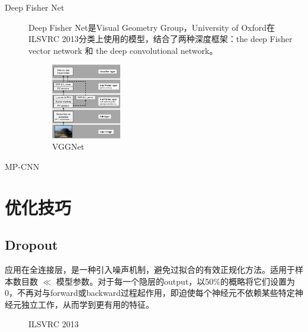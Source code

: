 \documentclass[12pt]{article}
\begin{document}
\begin{description}
\item[Deep Fisher Net] Deep Fisher Net\cite{simonyan2013deep}是Visual Geometry Group，University of Oxford在ILSVRC 2013分类上使用的模型，结合了两种深度框架：the deep Fisher vector network 和 the deep convolutional network。
\begin{figure}[!ht]
\centering
\includegraphics[width=0.3\textwidth]{vggnet1}
\caption{VGGNet}
\end{figure}

\item[MP-CNN]  
\end{description}

\section{优化技巧}
\subsection{Dropout}
应用在全连接层，是一种引入噪声机制，避免过拟合的有效正规化方法。适用于样本数目数 $\ll$ 模型参数。对于每一个隐层的output，以50\%的概略将它们设置为0，不再对与forward或backward过程起作用，即迫使每个神经元不依赖某些特定神经元独立工作，从而学到更有用的特征。
\begin{figure}[!ht]
  \centering 
  \caption{ILSVRC 2013}
\end{figure}
\end{document}
